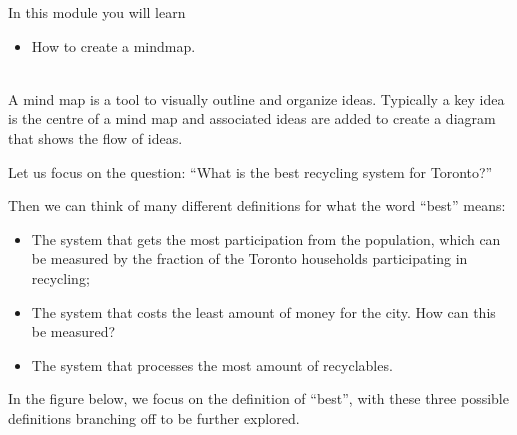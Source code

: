 \begin{siam}
	
	In this module you will learn
	\begin{itemize}
		\item How to create a mindmap.
	\end{itemize}


\hfill \\




A mind map is a tool to visually outline and organize ideas. Typically a key idea is the centre of a mind map and associated ideas are added to create a diagram that shows the flow of ideas. 

\begin{example}

Let us focus on the question: ``What is the best recycling system for Toronto?''

Then we can think of many different definitions for what the word ``best'' means:

\begin{itemize}
	\item The system that gets the most participation from the population, which can be measured by the fraction of the Toronto households participating in recycling;
	\item The system that costs the least amount of money for the city. How can this be measured?
	\item The system that processes the most amount of recyclables.
\end{itemize}

In the figure below, we focus on the definition of ``best'', with these three possible definitions branching off to be further explored.

\def\MindMapOne{
	\fill[color=lime] (0,0) rectangle (4,1) node[pos=.5] {\color{black}``Best'' recycling centre};
	\fill[color=BurntOrange] (6,2.5) rectangle (8,1.5) node[pos=.5] {\color{black}\begin{minipage}{40pt}\raggedright Most participation\end{minipage}};
	\fill[color=Goldenrod] (6,0) rectangle (8,1) node[pos=.5] {\color{black}\begin{minipage}{45pt}\raggedright Least cost to the city\end{minipage}};
	\fill[color=red!70!white] (6,-2) rectangle (8,-0.5) node[pos=.5] {\color{black}\begin{minipage}{50pt}\raggedright Processes the most recyclables\end{minipage}};
	\draw (4,0.75) -- (6,2);
	\draw (4,0.5) -- (6,0.5);
	\draw (4,0.25) -- (6,-1.25);
%
}


\end{example}
\end{siam}
